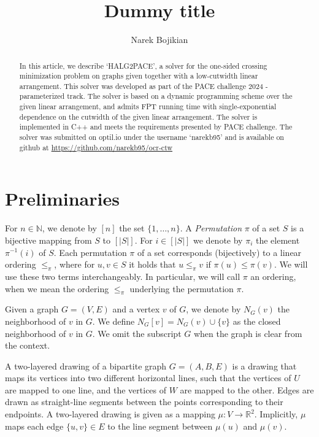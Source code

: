 \documentclass[a4paper,UKenglish,cleveref, autoref, thm-restate]{lipics-v2021}
\title{Dummy title} %
\author{Narek Bojikian}{Humboldt University of Berlin, Germany}{bojikian@informatik.hu-berlin.de}{[todo]}{}%
\newcommand{\layerone}{\ensuremath{U}}
\newcommand{\layertwo}{\ensuremath{W}}
\begin{document}
\maketitle

\begin{abstract}
    In this article, we describe `HALG2PACE', a solver for the one-sided crossing minimization problem on graphs given together with a low-cutwidth linear arrangement. 
    This solver was developed as part of the PACE challenge 2024 - parameterized track. The solver is based on a dynamic programming scheme over the given linear arrangement, and admits FPT running time with single-exponential dependence on the cutwidth of the given linear arrangement. The solver is implemented in C++ and meets the requirements presented by PACE challenge. The solver was submitted on optil.io under the username `narekb95' and is available on github at \url{https://github.com/narekb95/ocr-ctw}
\end{abstract}
\section{Preliminaries}
For $n\in \mathbb{N}$, we denote by $[n]$ the set $\{1,\dots,n\}$.
A \emph{Permutation} $\pi$ of a set $S$ is a bijective mapping from $S$ to $[|S|]$. For $i\in[|S|]$ we denote by $\pi_i$ the element $\pi^{-1}(i)$ of $S$. Each permutation $\pi$ of a set corresponds (bijectively) to a linear ordering $\leq_{\pi}$, where for $u,v\in S$ it holds that $u\leq_{\pi} v$ if $\pi(u)\leq \pi(v)$. We will use these two terms interchangeably. In particular, we will call $\pi$ an ordering, when we mean the ordering $\leq_{\pi}$ underlying the permutation $\pi$.

Given a graph $G = (V,E)$ and a vertex $v$ of $G$, we denote by $N_G(v)$ the neighborhood of $v$ in $G$. We define $N_G[v] = N_G(v)\cup \{v\}$ as the closed neighborhood of $v$ in $G$. We omit the subscript $G$ when the graph is clear from the context.

A two-layered drawing of a bipartite graph $G=(A,B,E)$ is a drawing that maps its vertices into two different horizontal lines, such that the vertices of $\layerone$ are mapped to one line, and the vertices of $\layertwo$ are mapped to the other. Edges are drawn as straight-line segments between the points corresponding to their endpoints. A two-layered drawing is given as a mapping $\mu\colon V\rightarrow \mathbb{R}^2$. Implicitly, $\mu$ maps each edge $\{u,v\} \in E$ to the line segment between $\mu(u)$ and $\mu(v)$.
\end{document}
